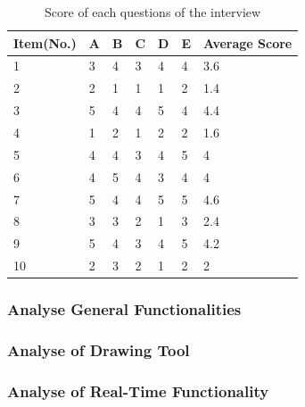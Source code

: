 \begin{table}[!htbp]
\centering
\begin{tabularx}{\textwidth}{@{}lXXXXXl@{}}
\toprule
Item(No.)   & A  & B  & C  & D  & E          & Average Score        \\ \midrule
1               & 3  & 4  & 3  & 4  & 4          & 3.6                     \\
2               & 2  & 1  & 1  & 1  & 2          & 1.4                     \\
3               & 5  & 4  & 4  & 5  & 4          & 4.4                     \\
4               & 1  & 2  & 1  & 2  & 2          & 1.6                     \\
5               & 4  & 4  & 3  & 4  & 5          & 4                     \\
6               & 4  & 5  & 4  & 3  & 4          & 4                     \\
7               & 5  & 4  & 4  & 5  & 5          & 4.6                     \\
8               & 3  & 3  & 2  & 1  & 3          & 2.4                     \\
9               & 5  & 4  & 3  & 4  & 5          & 4.2                     \\
10              & 2  & 3  & 2  & 1  & 2          & 2                     \\ \bottomrule        
\end{tabularx}
\caption{Score of each questions of the interview}
\label{table:score-interview}
\end{table}

\subsubsection{Analyse General Functionalities}
\subsubsection{Analyse of Drawing Tool }
\subsubsection{Analyse of Real-Time Functionality}